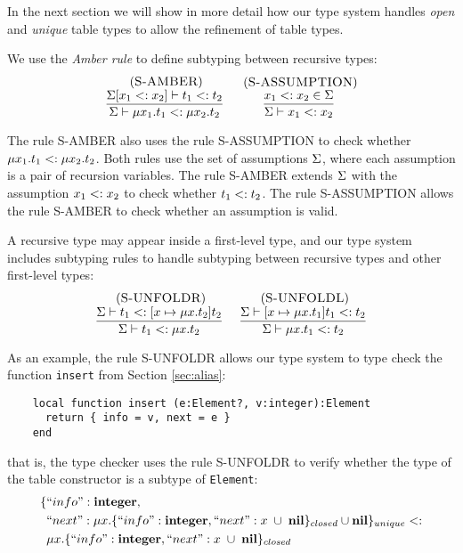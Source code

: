 In the next section we will show in more detail how our type system
handles \emph{open} and \emph{unique} table types to allow the refinement of
table types.

We use the \emph{Amber rule} \citep{cardelli1986amber} to define
subtyping between recursive types:
\[
\begin{array}{c}
\begin{array}{c}
\; (\textsc{S-AMBER})\\
\dfrac{\Sigma[x_{1} <: x_{2}] \vdash t_{1} <: t_{2}}
      {\Sigma \vdash \mu x_{1}.t_{1} <: \mu x_{2}.t_{2}}
\end{array}
\;
\begin{array}{c}
\; (\textsc{S-ASSUMPTION})\\
\dfrac{x_{1} <: x_{2} \in \Sigma}
      {\Sigma \vdash x_{1} <: x_{2}}
\end{array}
\end{array}
\]

The rule \textsc{S-AMBER} also uses the rule \textsc{S-ASSUMPTION}
to check whether $\mu x_{1}.t_{1} <: \mu x_{2}.t_{2}$.
Both rules use the set of assumptions $\Sigma$,
where each assumption is a pair of recursion variables.
The rule \textsc{S-AMBER} extends $\Sigma$ with the assumption
$x_{1} <: x_{2}$ to check whether $t_{1} <: t_{2}$.
The rule \textsc{S-ASSUMPTION} allows the rule \textsc{S-AMBER}
to check whether an assumption is valid.

A recursive type may appear inside a first-level type, and our
type system includes subtyping rules to handle subtyping between
recursive types and other first-level types:
\[
\begin{array}{c}
\begin{array}{c}
\; (\textsc{S-UNFOLDR})\\
\dfrac{\Sigma \vdash t_{1} <: [x \mapsto \mu x.t_{2}]t_{2}}
      {\Sigma \vdash t_{1} <: \mu x.t_{2}}
\end{array}
\;
\begin{array}{c}
\; (\textsc{S-UNFOLDL})\\
\dfrac{\Sigma \vdash [x \mapsto \mu x.t_{1}]t_{1} <: t_{2}}
      {\Sigma \vdash \mu x.t_{1} <: t_{2}}
\end{array}
\end{array}
\]

As an example, the rule \textsc{S-UNFOLDR} allows our type system to
type check the function \texttt{insert} from Section \ref{sec:alias}:
\begin{verbatim}
    local function insert (e:Element?, v:integer):Element
      return { info = v, next = e }
    end
\end{verbatim}
that is, the type checker uses the rule \textsc{S-UNFOLDR} to verify whether
the type of the table constructor is a subtype of \texttt{Element}:
\begin{align*}
\{ & ``info":\mathbf{integer}, \\
   & ``next":\mu x.\{``info":\mathbf{integer}, ``next":x \;\cup\; \mathbf{nil}\}_{closed} \cup \mathbf{nil} \}_{unique} <: \\
& \mu x.\{``info":\mathbf{integer}, ``next":x \;\cup\; \mathbf{nil}\}_{closed}
\end{align*}

